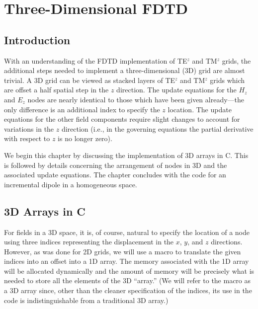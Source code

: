 \chapter{Three-Dimensional FDTD \label{chap:3d}}


\renewcommand{\thefootnote}{\fnsymbol{footnote}}

\section{Introduction}

With an understanding of the FDTD implementation of TE$^z$ and TM$^z$
grids, the additional steps needed to implement a three-dimensional
(3D) grid are almost trivial.  A 3D grid can be viewed as stacked
layers of TE$^z$ and TM$^z$ grids which are offset a half spatial step
in the $z$ direction.  The update equations for the $H_z$ and $E_z$
nodes are nearly identical to those which have been given
already---the only difference is an additional index to specify the
$z$ location.  The update equations for the other field components
require slight changes to account for variations in the $z$ direction
(i.e., in the governing equations the partial derivative with respect to
$z$ is no longer zero).

We begin this chapter by discussing the implementation of 3D arrays in
C.  This is followed by details concerning the arrangement of nodes in
3D and the associated update equations.  The chapter concludes with
the code for an incremental dipole in a homogeneous space.

\section{3D Arrays in C \label{sec:3darrays}}

For fields in a 3D space, it is, of course, natural to specify the
location of a node using three indices representing the
displacement in the $x$, $y$, and $z$ directions.  However, as was
done for 2D grids, we will use a macro to translate the given indices
into an offset into a 1D array.  The memory associated with the 1D
array will be allocated dynamically and the amount of memory will be
precisely what is needed to store all the elements of the 3D
``array.''  (We will refer to the macro as a 3D array since, other
than the cleaner specification of the indices, its use in the code is
indistinguishable from a traditional 3D array.)


